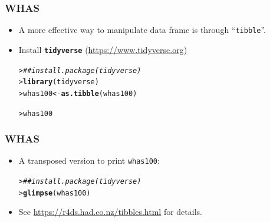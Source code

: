 \documentclass[10pt]{beamer}\usepackage[]{graphicx}\usepackage[]{color}
\makeatletter
\newcommand{\hlcom}[1]{\textcolor[rgb]{0.678,0.584,0.686}{\textit{#1}}}%
\newcommand{\hlstd}[1]{\textcolor[rgb]{0.345,0.345,0.345}{#1}}%
\newcommand{\hlkwb}[1]{\textcolor[rgb]{0.69,0.353,0.396}{#1}}%
\newcommand{\hlkwd}[1]{\textcolor[rgb]{0.737,0.353,0.396}{\textbf{#1}}}%
\newenvironment{kframe}{%
 \def\at@end@of@kframe{}%
 \ifinner\ifhmode%
  \def\at@end@of@kframe{\end{minipage}}%
  \begin{minipage}{\columnwidth}%
 \fi\fi%
 \def\FrameCommand##1{\hskip\@totalleftmargin \hskip-\fboxsep
 \colorbox{shadecolor}{##1}\hskip-\fboxsep
     \hskip-\linewidth \hskip-\@totalleftmargin \hskip\columnwidth}%
 \MakeFramed {\advance\hsize-\width
   \@totalleftmargin\z@ \linewidth\hsize
   \@setminipage}}%
 {\par\unskip\endMakeFramed%
 \at@end@of@kframe}
\newenvironment{knitrout}{}{} %
\renewenvironment{knitrout}{\setlength{\topsep}{-.2mm}}{}
\newcommand{\pkg}[1]{{\textbf{\texttt{#1}}}}
\makeatother
\begin{document}
\begin{frame}[fragile]
\frametitle{WHAS}
  \begin{itemize}
  \item A more effective way to manipulate data frame is through ``\texttt{tibble}''.
  \item Install \pkg{tidyverse} (\url{https://www.tidyverse.org})
\begin{knitrout}\scriptsize
{}\color{fgcolor}\begin{kframe}
\begin{alltt}
\hlstd{> }\hlcom{## install.package(tidyverse)}
\hlstd{> }\hlkwd{library}\hlstd{(tidyverse)}
\hlstd{> }\hlstd{whas100} \hlkwb{<-} \hlkwd{as.tibble}\hlstd{(whas100)}
\end{alltt}


{\ttfamily\noindent\bfseries\color{errorcolor}{Error in as.tibble(whas100): object 'whas100' not found}}\begin{alltt}
\hlstd{> }\hlstd{whas100}
\end{alltt}


{\ttfamily\noindent\bfseries\color{errorcolor}{Error in eval(expr, envir, enclos): object 'whas100' not found}}\end{kframe}
\end{knitrout}
  \end{itemize}
\end{frame}

\begin{frame}[fragile]
\frametitle{WHAS}
  \begin{itemize}
  \item A transposed version to print \texttt{whas100}:
\begin{knitrout}\scriptsize
{}\color{fgcolor}\begin{kframe}
\begin{alltt}
\hlstd{> }\hlcom{## install.package(tidyverse)}
\hlstd{> }\hlkwd{glimpse}\hlstd{(whas100)}
\end{alltt}


{\ttfamily\noindent\bfseries\color{errorcolor}{Error in glimpse(whas100): object 'whas100' not found}}\end{kframe}
\end{knitrout}
  \item See \url{https://r4ds.had.co.nz/tibbles.html} for details.
  \end{itemize}
\end{frame}
\end{document}
